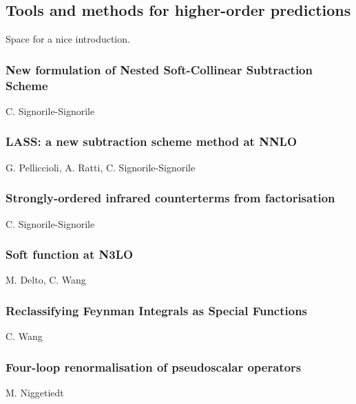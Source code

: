 \documentclass{FBR_Bericht_2025}
\begin{document}
\subsection{Tools and methods for higher-order predictions}
\begin{refsection}
Space for a nice introduction.
%
\subsubsection{New formulation of Nested Soft-Collinear Subtraction Scheme}
\begin{Namen}
C. Signorile-Signorile
\end{Namen}
%
\subsubsection{LASS: a new subtraction scheme method at NNLO}
\begin{Namen}
G. Pelliccioli, A. Ratti, C. Signorile-Signorile
\end{Namen}
%
\subsubsection{Strongly-ordered infrared counterterms from factorisation}
\begin{Namen}
C. Signorile-Signorile
\end{Namen}
%
\subsubsection{Soft function at N3LO}
\begin{Namen}
M. Delto, C. Wang
\end{Namen}
%
\subsubsection{Reclassifying Feynman Integrals as Special Functions}
\begin{Namen}
C. Wang
\end{Namen}
%
\subsubsection{Four-loop renormalisation of pseudoscalar operators}
\begin{Namen}
M. Niggetiedt
\end{Namen}
%
\printbibliography[heading=subbibliography]
\end{refsection}
\end{document}
